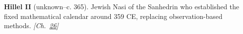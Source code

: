 \textbf{Hillel II} (unknown–c. 365). Jewish Nasi of the Sanhedrin who established the fixed mathematical calendar around 359 CE, replacing observation-based methods. \emph{[Ch.~\hyperref[ch:jewishcalendar]{26}]}

